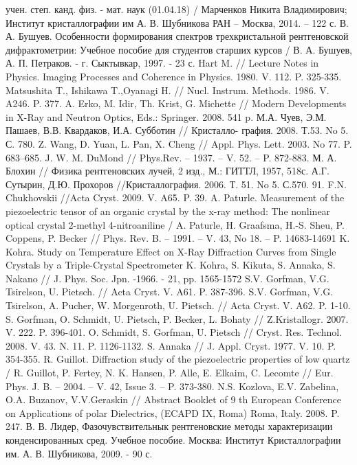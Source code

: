 \begin{thebibliography}{99}
учен. степ. канд. физ. - мат. наук (01.04.18) /
Марченков Никита Владимирович; Институт кристаллографии им А. В. Шубникова РАН  – Москва, 2014. – 122 с.
В. А. Бушуев. Особенности формирования спектров трехкристальной рентгеновской дифрактометрии:
Учебное пособие для студентов старших курсов  / В. А. Бушуев, А. П. Петраков. - г. Сыктывкар, 1997. - 23 с.
Hart M. // Lecture Notes in Physics. Imaging Processes and Coherence in Physics. 1980. V. 112. P. 325-335.
Matsushita T., Ishikawa T.,Oyanagi H. // Nucl. Instrum. Methods. 1986. V. A246. P. 377.
A. Erko, M. Idir, Th. Krist, G. Michette // Modern Developments in X-Ray and Neutron Optics, Eds.: Springer. 2008. 541 p.
М.А. Чуев, Э.М. Пашаев, В.В. Квардаков, И.А. Субботин // Кристалло- графия. 2008. Т.53. No 5. С. 780.
Z. Wang, D. Yuan, L. Pan, X. Cheng // Appl. Phys. Lett. 2003. No 77. P. 683–685.
J. W. M. DuMond // Phys.Rev. – 1937. – V. 52. – P. 872-883.
М. А. Блохин // Физика рентгеновских лучей, 2 изд., М.: ГИТТЛ, 1957, 518с.
А.Г. Сутырин, Д.Ю. Прохоров //Кристаллография. 2006. Т. 51. No 5. С.570. 91. F.N. Chukhovskii //Acta Cryst. 2009. V. A65. P. 39.
A. Paturle. Measurement of the piezoelectric tensor of an organic crystal by the x-ray method:
The nonlinear optical crystal 2-methyl 4-nitroaniline / A. Paturle, H. Graafsma,
H.-S. Sheu, P. Coppens, P. Becker // Phys. Rev. B. – 1991. – V. 43, No 18. – P. 14683-14691
K. Kohra. Study on Temperature Effect on X-Ray
Diffraction Curves from Single Crystals by a Triple-Crystal Spectrometer
K. Kohra, S. Kikuta, S. Annaka, S. Nakano // J. Phys. Soc. Jpn. -1966. - 21, pp. 1565-1572
S.V. Gorfman, V.G. Tsirelson, U. Pietsch. // Acta Cryst. V. A61. P. 387-396.
S.V. Gorfman, V.G. Tsirelson, A. Pucher, W. Morgenroth, U. Pietsch. // Acta Cryst. V. A62. P. 1-10.
S. Gorfman, O. Schmidt, U. Pietsch, P. Becker, L. Bohaty // Z.Kristallogr. 2007. V. 222. P. 396-401.
O. Schmidt, S. Gorfman, U. Pietsch // Cryst. Res. Technol. 2008. V. 43. N. 11. P. 1126-1132.
S. Annaka // J. Appl. Cryst. 1977. V. 10. P. 354-355.
R. Guillot. Diffraction study of the piezoelectric properties of low quartz
/ R. Guillot, P. Fertey, N. K. Hansen, P. Alle, E. Elkaim, C. Lecomte //
Eur. Phys. J. B. – 2004. – V. 42, Issue 3. – P. 373-380.
N.S. Kozlova, E.V. Zabelina, O.A. Buzanov, V.V.Geraskin //
Abstract Booklet of 9 th European Conference on Applications of
polar Dielectrics, (ECAPD IX, Roma) Roma, Italy. 2008. P. 247.
В. В. Лидер, Фазочувствительнык рентгеновские методы характеризации
конденсированных сред. Учебное пособие. Москва: Институт Кристаллографии им. А. В. Шубникова, 2009. - 90 с.
\end{thebibliography}
